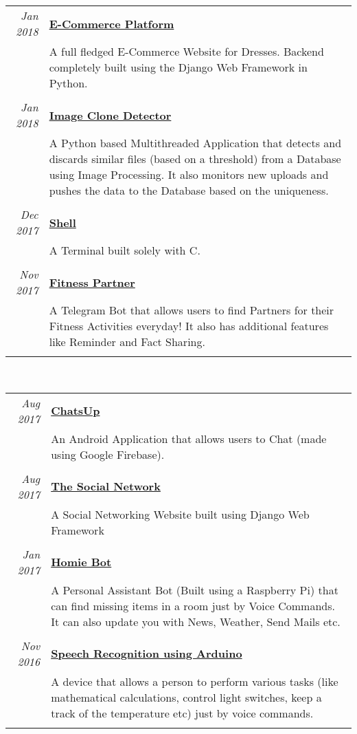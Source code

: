 \documentclass[a4paper,10pt]{article}
\begin{document}
 \begin{tabular}{r|p{14.5cm}}
 \emph{Jan 2018} & \href{https://github.com/YashitM/E-Commerce-Platform}{\textbf{E-Commerce Platform}} \\&\normalsize{A full fledged E-Commerce Website for Dresses. Backend completely built using the Django Web Framework in Python.}\\\multicolumn{2}{c}{} \\
 \emph{Jan 2018} & \href{https://github.com/YashitM/Image-Clone-Detection}{\textbf{Image Clone Detector}} \\&\normalsize{A Python based Multithreaded Application that detects and discards similar files (based on a threshold) from a Database using Image Processing. It also monitors new uploads and pushes the data to the Database based on the uniqueness.}\\\multicolumn{2}{c}{} \\
 \emph{Dec 2017} & \href{https://shell.yashitm.tech}{\textbf{Shell}} \\&\normalsize{A Terminal built solely with C.}\\\multicolumn{2}{c}{} \\
 \emph{Nov 2017} & \href{https://fitnesspartner.yashitm.tech}{\textbf{Fitness Partner}} \\&\normalsize{A Telegram Bot that allows users to find Partners for their Fitness Activities everyday! It also has additional features like Reminder and Fact Sharing.}\\\multicolumn{2}{c}{} \\
\end{tabular}\\
\begin{tabular}{r|p{14.5cm}}
 \emph{Aug 2017} & \href{https://github.com/YashitM/ChatsUp}{\textbf{ChatsUp}} \\&\normalsize{An Android Application that allows users to Chat (made using Google Firebase).}\\\multicolumn{2}{c}{} \\ 
 \emph{Aug 2017} & \href{https://github.com/abhay-tyagi/Social_Network}{\textbf{The Social Network}} \\&\normalsize{A Social Networking Website built using Django Web Framework}\\\multicolumn{2}{c}{} \\
 \emph{Jan 2017} & \href{https://homiebot.yashitm.tech}{\textbf{Homie Bot}} \\&\normalsize{A Personal Assistant Bot (Built using a Raspberry Pi) that can find missing items in a room just by Voice Commands. It can also update you with News, Weather, Send Mails etc.}\\\multicolumn{2}{c}{} \\
 \emph{Nov 2016} & \href{https://github.com/YashitM/Arduino-Speech-Recog}{\textbf{Speech Recognition using Arduino}} \\&\normalsize{A device that allows a person to perform various tasks (like mathematical calculations, control light switches, keep a track of the temperature etc) just by voice commands.}\\\multicolumn{2}{c}{} \\
\end{tabular}
\end{document}
